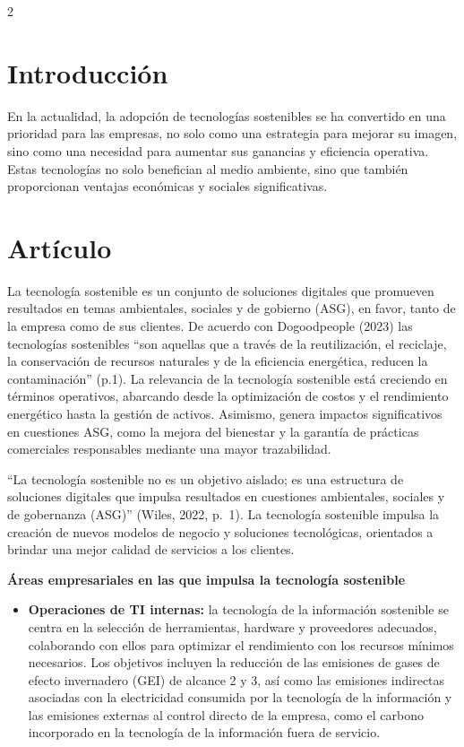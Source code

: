 \documentclass[12pt,spanish,Letterpaper,openany]{book}
\providecommand{\tightlist}{%
  \setlength{\itemsep}{0pt}\setlength{\parskip}{0pt}}
\begin{document}
\begin {multicols}{2}
\hypertarget{introducciuxf3n-9}{%
\section{Introducción}\label{introducciuxf3n-9}}

En la actualidad, la adopción de tecnologías sostenibles se ha convertido en una prioridad para las empresas, no solo como una estrategia para mejorar su imagen, sino como una necesidad para aumentar sus ganancias y eficiencia operativa. Estas tecnologías no solo benefician al medio ambiente, sino que también proporcionan ventajas económicas y sociales significativas.

\hypertarget{artuxedculo-8}{%
\section{Artículo}\label{artuxedculo-8}}

La tecnología sostenible es un conjunto de soluciones digitales que promueven resultados en temas ambientales, sociales y de gobierno (ASG), en favor, tanto de la empresa como de sus clientes. De acuerdo con Dogoodpeople (2023) las tecnologías sostenibles ``son aquellas que a través de la reutilización, el reciclaje, la conservación de recursos naturales y de la eficiencia energética, reducen la contaminación'' (p.1). La relevancia de la tecnología sostenible está creciendo en términos operativos, abarcando desde la optimización de costos y el rendimiento energético hasta la gestión de activos. Asimismo, genera impactos significativos en cuestiones ASG, como la mejora del bienestar y la garantía de prácticas comerciales responsables mediante una mayor trazabilidad.

``La tecnología sostenible no es un objetivo aislado; es una estructura de soluciones digitales que impulsa resultados en cuestiones ambientales, sociales y de gobernanza (ASG)'' (Wiles, 2022, p.~1). La tecnología sostenible impulsa la creación de nuevos modelos de negocio y soluciones tecnológicas, orientados a brindar una mejor calidad de servicios a los clientes.

\textbf{Áreas empresariales en las que impulsa la tecnología sostenible}

\begin{itemize}
\tightlist
\item
  \textbf{Operaciones de TI internas:} la tecnología de la información sostenible se centra en la selección de herramientas, hardware y proveedores adecuados, colaborando con ellos para optimizar el rendimiento con los recursos mínimos necesarios. Los objetivos incluyen la reducción de las emisiones de gases de efecto invernadero (GEI) de alcance 2 y 3, así como las emisiones indirectas asociadas con la electricidad consumida por la tecnología de la información y las emisiones externas al control directo de la empresa, como el carbono incorporado en la tecnología de la información fuera de servicio.
\end{itemize}


\end{multicols}
\end{document}
